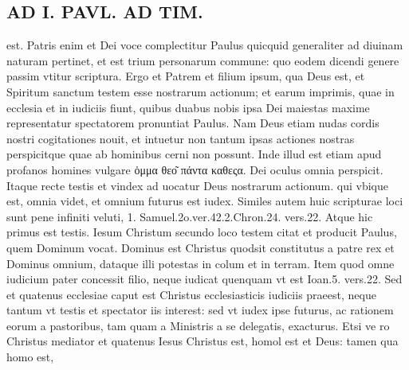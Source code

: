 \documentclass{article}
\begin{document}
\begin{pages}
\section*{AD I. PAVL. AD TIM. }
\marginpar{[ p. ]}\pstart est. Patris enim et Dei voce complectitur Paulus quicquid generaliter ad diuinam naturam pertinet, et est trium personarum commune: quo eodem dicendi genere passim vtitur scriptura. Ergo et Patrem et filium ipsum, qua Deus est, et Spiritum sanctum testem esse nostrarum actionum; et earum imprimis, quae in ecclesia et in iudiciis fiunt, quibus duabus nobis ipsa Dei maiestas maxime representatur spectatorem pronuntiat Paulus. Nam Deus etiam nudas cordis nostri cogitationes nouit, et intuetur non tantum ipsas actiones nostras perspicitque quae ab hominibus cerni non possunt. Inde illud est etiam apud profanos homines vulgare ὁμμα θεο͂ πάντα καθεςα. Dei oculus omnia perspicit. Itaque recte testis et vindex ad uocatur Deus nostrarum actionum. qui vbique est, omnia videt, et omnium futurus est iudex. Similes autem huic scripturae loci sunt pene infiniti veluti, 1. Samuel.2o.ver.42.2.Chron.24. vers.22. Atque hic primus est testis. Iesum Christum secundo loco testem citat et producit Paulus, quem Dominum vocat. Dominus est Christus quodsit constitutus a patre rex et Dominus omnium, dataque illi potestas in colum et in terram. Item quod omne iudicium pater concessit filio, neque iudicat quenquam vt est Ioan.5. vers.22. Sed et quatenus ecclesiae caput est Christus ecclesiasticis iudiciis praeest, neque tantum vt testis et spectator iis interest: sed vt iudex ipse futurus, ac rationem eorum a pastoribus, tam quam a Ministris a se delegatis, exacturus. Etsi ve ro Christus mediator et quatenus Iesus Christus est, homol est et Deus: tamen qua homo est,  \pend

\end{pages}
\end{document}
